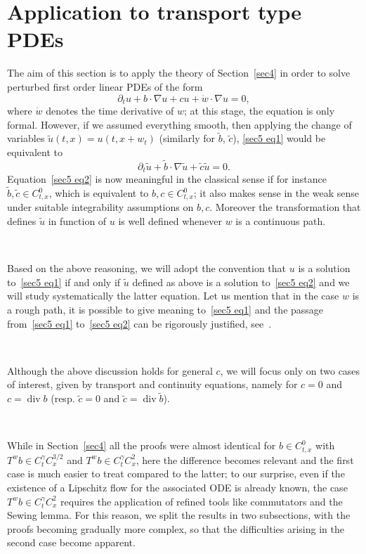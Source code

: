 \documentclass[10pt]{article}
\newcommand{\tmcolor}[2]{{\color{#1}{#2}}}
\newcommand{\tmop}[1]{\ensuremath{\operatorname{#1}}}
\begin{document}
\section{Application to transport type PDEs}\label{sec5}

\tmcolor{blue}{}The aim of this section is to apply the theory of
Section~\ref{sec4} in order to solve perturbed first order linear PDEs of the
form
\begin{equation}
  \partial_t u + b \cdot \nabla u + c u + \dot{w} \cdot \nabla u = 0,
  \label{sec5 eq1}
\end{equation}
where $\dot{w}$ denotes the time derivative of $w$; at this stage, the
equation is only formal. However, if we assumed everything smooth, then
applying the change of variables $\tilde{u} (t, x) = u (t, x + w_t)$
(similarly for $\tilde{b}$, $\tilde{c}$), {\eqref{sec5 eq1}} would be
equivalent to
\begin{equation}
  \partial_t \tilde{u} + \tilde{b} \cdot \nabla \tilde{u} + \tilde{c} 
  \tilde{u} = 0. \label{sec5 eq2}
\end{equation}
Equation~{\eqref{sec5 eq2}} is now meaningful in the classical sense if for
instance $\tilde{b}, \tilde{c} \in C^0_{t, x}$, which is equivalent to $b, c
\in C^0_{t, x}$; it also makes sense in the weak sense under suitable
integrability assumptions on $b, c$. Moreover the transformation that defines
$\tilde{u}$ in function of $u$ is well defined whenever $w$ is a continuous
path.

\

Based on the above reasoning, we will adopt the convention that $u$ is a
solution to~{\eqref{sec5 eq1}} if and only if $\tilde{u}$ defined as above is
a solution to~{\eqref{sec5 eq2}} and we will study systematically the latter
equation. Let us mention that in the case $w$ is a rough path, it is possible
to give meaning to~{\eqref{sec5 eq1}} and the passage from~{\eqref{sec5 eq1}}
to~{\eqref{sec5 eq2}} can be rigorously justified, see~{\cite{catellier}}.

\

Although the above discussion holds for general $c$, we will focus only on
two cases of interest, given by transport and continuity equations, namely for
$c = 0$ and $c = \tmop{div} b$ (resp. $\tilde{c} = 0$ and $\tilde{c} =
\tmop{div} \tilde{b}$).

\

While in Section~\ref{sec4} all the proofs were almost identical for $b \in
C^0_{t, x}$ with $T^w b \in C^{\gamma}_t C^{3 / 2}_x$ and $T^w b \in
C^{\gamma}_t C^2_x$, here the difference becomes relevant and the first case
is much easier to treat compared to the latter; to our surprise, even if the
existence of a Lipschitz flow for the associated ODE is already known, the
case $T^w b \in C^{\gamma}_t C^2_x$ requires the application of refined tools
like commutators and the Sewing lemma. For this reason, we split the results
in two subsections, with the proofs becoming gradually more complex, so that
the difficulties arising in the second case become apparent.
\end{document}
